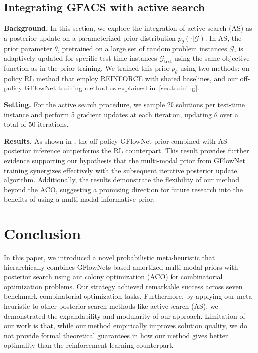 \documentclass[twoside]{article}
\theoremstyle{plain}
\theoremstyle{definition}
\theoremstyle{remark}
\begin{document}
\subsection{Integrating GFACS with active search}
\label{sec:exp-as}

\textbf{Background.} In this section, we explore the integration of active search (AS) as a posterior update on a parameterized prior distribution \( p_{\theta}(\cdot|\mathcal{G}) \). In AS, the prior parameter \(\theta\), pretrained on a large set of random problem instances \(\mathcal{G}\), is adaptively updated for specific test-time instances \(\mathcal{G}_{\text{test}}\) using the same objective function as in the prior training. We trained this prior \( p_{\theta} \) using two methods: on-policy RL method \citep{kwon2020pomo} that employ REINFORCE with shared baselines, and our off-policy GFlowNet training method as explained in~\cref{sec:training}.

\textbf{Setting.} For the active search procedure, we sample 20 solutions per test-time instance and perform 5 gradient updates at each iteration, updating \(\theta\) over a total of 50 iterations.

\begin{table}[t]
    \centering
    \caption{Evaluation results combine with active search (AS) as a posterior search method.}
    \vspace{-0.5em}
    \resizebox{1.0\linewidth}{!}{}
    \label{tab:active_search}
    \vspace{-0.75em}
\end{table}

\textbf{Results.} As shown in , the off-policy GFlowNet prior combined with AS posterior inference outperforms the RL counterpart.  This result provides further evidence supporting our hypothesis that the multi-modal prior from GFlowNet training synergizes effectively with the subsequent iterative posterior update algorithm. Additionally, the results demonstrate the flexibility of our method beyond the ACO, suggesting a promising direction for future research into the benefits of using a multi-modal informative prior.


\section{Conclusion}

In this paper, we introduced a novel probabilistic meta-heuristic that hierarchically combines GFlowNets-based amortized multi-modal priors with posterior search using ant colony optimization (ACO) for combinatorial optimization problems. Our strategy achieved remarkable success across seven benchmark combinatorial optimization tasks. Furthermore, by applying our meta-heuristic to other posterior search methods like active search (AS), we demonstrated the expandability and modularity of our approach. Limitation of our work is that, while our method empirically improves solution quality, we do not provide formal theoretical guarantees in how our method gives better optimality than the reinforcement learning counterpart.
\end{document}
